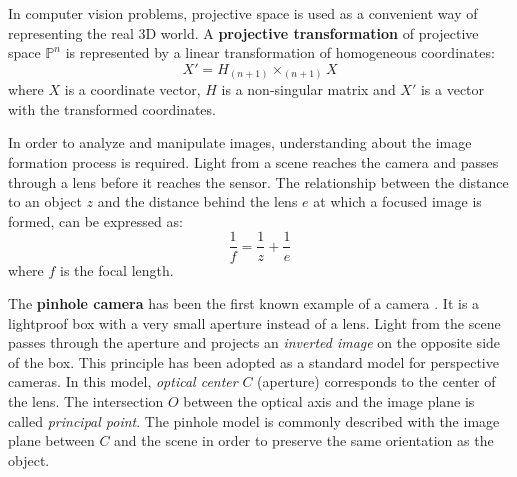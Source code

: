 In computer vision problems, projective space is used as a convenient way of representing the real 3D world.
A \textbf{projective transformation} of projective space $\mathds{P}^n$ is represented by a linear transformation of homogeneous coordinates:
\begin{equation}
X' = H_{(n+1)} \times _{(n+1)}X
\end{equation}
where $X$ is a coordinate vector, $H$ is a non-singular matrix and $X'$ is a vector with the transformed coordinates.

In order to analyze and manipulate images, understanding about the image formation process is required.
Light from a scene reaches the camera and passes through a lens before it reaches the sensor.
The relationship between the distance to an object $z$ and the distance behind the lens $e$ at which a focused image is formed, can be expressed as:
\begin{equation}
\label{eq:optics}
\frac{1}{f} = \frac{1}{z} + \frac{1}{e}
\end{equation}
where $f$ is the focal length.

The \textbf{pinhole camera} has been the first known example of a camera \cite{gernsheim1969history}.
It is a lightproof box with a very small aperture instead of a lens.
Light from the scene passes through the aperture and projects an \textit{inverted image} on the opposite side of the box.
This principle has been adopted as a standard model for perspective cameras.
In this model, \textit{optical center} $C$ (aperture) corresponds to the center of the lens.
The intersection $O$ between the optical axis and the image plane is called \textit{principal point}.
The pinhole model is commonly described with the image plane between $C$ and the scene in order to preserve the same orientation as the object.


